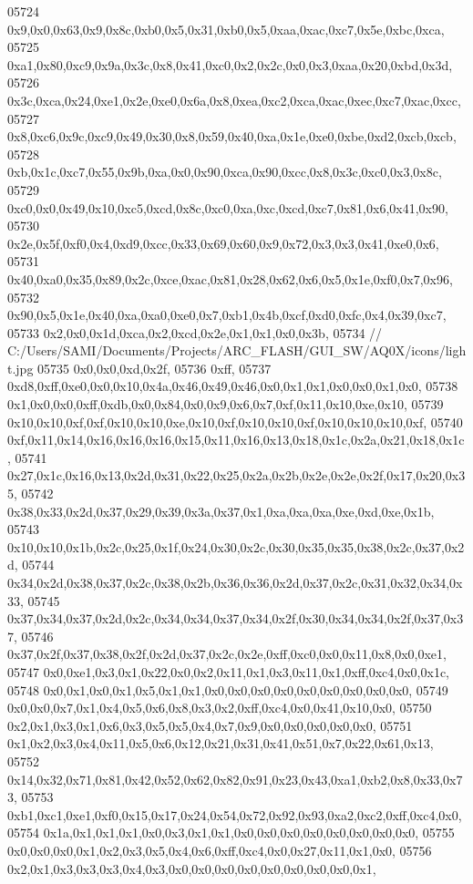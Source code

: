 \begin{DoxyCode}
05724   0x9,0x0,0x63,0x9,0x8c,0xb0,0x5,0x31,0xb0,0x5,0xaa,0xac,0xc7,0x5e,0xbc,0xca,
05725   0xa1,0x80,0xc9,0x9a,0x3c,0x8,0x41,0xc0,0x2,0x2c,0x0,0x3,0xaa,0x20,0xbd,0x3d,
05726   0x3c,0xca,0x24,0xe1,0x2e,0xe0,0x6a,0x8,0xea,0xc2,0xca,0xac,0xec,0xc7,0xac,0xcc,
05727   0x8,0xc6,0x9c,0xc9,0x49,0x30,0x8,0x59,0x40,0xa,0x1e,0xe0,0xbe,0xd2,0xcb,0xcb,
05728   0xb,0x1c,0xc7,0x55,0x9b,0xa,0x0,0x90,0xca,0x90,0xcc,0x8,0x3c,0xc0,0x3,0x8c,
05729   0xc0,0x0,0x49,0x10,0xc5,0xcd,0x8c,0xc0,0xa,0xc,0xcd,0xc7,0x81,0x6,0x41,0x90,
05730   0x2e,0x5f,0xf0,0x4,0xd9,0xcc,0x33,0x69,0x60,0x9,0x72,0x3,0x3,0x41,0xe0,0x6,
05731   0x40,0xa0,0x35,0x89,0x2c,0xce,0xac,0x81,0x28,0x62,0x6,0x5,0x1e,0xf0,0x7,0x96,
05732   0x90,0x5,0x1e,0x40,0xa,0xa0,0xe0,0x7,0xb1,0x4b,0xcf,0xd0,0xfc,0x4,0x39,0xc7,
05733   0x2,0x0,0x1d,0xca,0x2,0xcd,0x2e,0x1,0x1,0x0,0x3b,
05734     \textcolor{comment}{// C:/Users/SAMI/Documents/Projects/ARC\_FLASH/GUI\_SW/AQ0X/icons/light.jpg}
05735   0x0,0x0,0xd,0x2f,
05736   0xff,
05737   0xd8,0xff,0xe0,0x0,0x10,0x4a,0x46,0x49,0x46,0x0,0x1,0x1,0x0,0x0,0x1,0x0,
05738   0x1,0x0,0x0,0xff,0xdb,0x0,0x84,0x0,0x9,0x6,0x7,0xf,0x11,0x10,0xe,0x10,
05739   0x10,0x10,0xf,0xf,0x10,0x10,0xe,0x10,0xf,0x10,0x10,0xf,0x10,0x10,0x10,0xf,
05740   0xf,0x11,0x14,0x16,0x16,0x16,0x15,0x11,0x16,0x13,0x18,0x1c,0x2a,0x21,0x18,0x1c,
05741   0x27,0x1c,0x16,0x13,0x2d,0x31,0x22,0x25,0x2a,0x2b,0x2e,0x2e,0x2f,0x17,0x20,0x35,
05742   0x38,0x33,0x2d,0x37,0x29,0x39,0x3a,0x37,0x1,0xa,0xa,0xa,0xe,0xd,0xe,0x1b,
05743   0x10,0x10,0x1b,0x2c,0x25,0x1f,0x24,0x30,0x2c,0x30,0x35,0x35,0x38,0x2c,0x37,0x2d,
05744   0x34,0x2d,0x38,0x37,0x2c,0x38,0x2b,0x36,0x36,0x2d,0x37,0x2c,0x31,0x32,0x34,0x33,
05745   0x37,0x34,0x37,0x2d,0x2c,0x34,0x34,0x37,0x34,0x2f,0x30,0x34,0x34,0x2f,0x37,0x37,
05746   0x37,0x2f,0x37,0x38,0x2f,0x2d,0x37,0x2c,0x2e,0xff,0xc0,0x0,0x11,0x8,0x0,0xe1,
05747   0x0,0xe1,0x3,0x1,0x22,0x0,0x2,0x11,0x1,0x3,0x11,0x1,0xff,0xc4,0x0,0x1c,
05748   0x0,0x1,0x0,0x1,0x5,0x1,0x1,0x0,0x0,0x0,0x0,0x0,0x0,0x0,0x0,0x0,
05749   0x0,0x0,0x7,0x1,0x4,0x5,0x6,0x8,0x3,0x2,0xff,0xc4,0x0,0x41,0x10,0x0,
05750   0x2,0x1,0x3,0x1,0x6,0x3,0x5,0x5,0x4,0x7,0x9,0x0,0x0,0x0,0x0,0x0,
05751   0x1,0x2,0x3,0x4,0x11,0x5,0x6,0x12,0x21,0x31,0x41,0x51,0x7,0x22,0x61,0x13,
05752   0x14,0x32,0x71,0x81,0x42,0x52,0x62,0x82,0x91,0x23,0x43,0xa1,0xb2,0x8,0x33,0x73,
05753   0xb1,0xc1,0xe1,0xf0,0x15,0x17,0x24,0x54,0x72,0x92,0x93,0xa2,0xc2,0xff,0xc4,0x0,
05754   0x1a,0x1,0x1,0x1,0x0,0x3,0x1,0x1,0x0,0x0,0x0,0x0,0x0,0x0,0x0,0x0,
05755   0x0,0x0,0x0,0x1,0x2,0x3,0x5,0x4,0x6,0xff,0xc4,0x0,0x27,0x11,0x1,0x0,
05756   0x2,0x1,0x3,0x3,0x3,0x4,0x3,0x0,0x0,0x0,0x0,0x0,0x0,0x0,0x0,0x1,

\end{DoxyCode}
